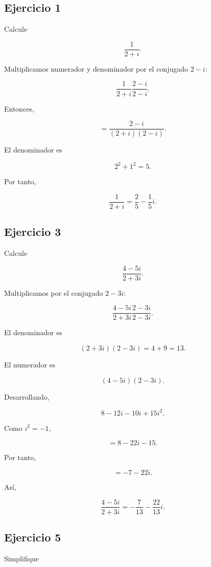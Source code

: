 \documentclass[12pt]{article}
\begin{document}
\subsection*{Ejercicio 1}

Calcule

\[
\frac{1}{2+i}.
\]

Multiplicamos numerador y denominador por el conjugado \(2-i\):

\[
\frac{1}{2+i}
\frac{2-i}{2-i}.
\]

Entonces,

\[
=
\frac{2-i}{(2+i)(2-i)}.
\]

El denominador es

\[
2^2+1^2=5.
\]

Por tanto,

\[
\boxed{
\frac{1}{2+i}
=
\frac25-\frac15i
}.
\]


\subsection*{Ejercicio 3}

Calcule

\[
\frac{4-5i}{2+3i}.
\]

Multiplicamos por el conjugado \(2-3i\):

\[
\frac{4-5i}{2+3i}
\frac{2-3i}{2-3i}.
\]

El denominador es

\[
(2+3i)(2-3i)=4+9=13.
\]

El numerador es

\[
(4-5i)(2-3i).
\]

Desarrollando,

\[
8-12i-10i+15i^2.
\]

Como \(i^2=-1\),

\[
=8-22i-15.
\]

Por tanto,

\[
=-7-22i.
\]

Así,

\[
\boxed{
\frac{4-5i}{2+3i}
=
-\frac7{13}-\frac{22}{13}i
}.
\]


\subsection*{Ejercicio 5}

Simplifique
\end{document}
